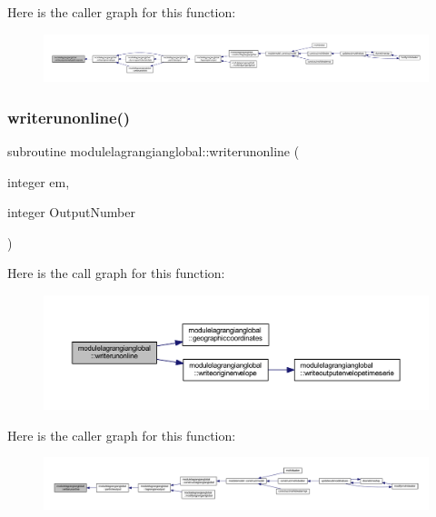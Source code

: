 Here is the caller graph for this function\+:\nopagebreak
\begin{figure}[H]
\begin{center}
\leavevmode
\includegraphics[width=350pt]{namespacemodulelagrangianglobal_a730caaa1e8cb909c0d86b6d7c081175c_icgraph}
\end{center}
\end{figure}
\mbox{\label{namespacemodulelagrangianglobal_af58c4faddb51056e6ab9190e049a564b}} 
\subsubsection{\texorpdfstring{writerunonline()}{writerunonline()}}
{\footnotesize\ttfamily subroutine modulelagrangianglobal\+::writerunonline (\begin{DoxyParamCaption}\item[{integer}]{em,  }\item[{integer}]{Output\+Number }\end{DoxyParamCaption})\hspace{0.3cm}{\ttfamily [private]}}

Here is the call graph for this function\+:\nopagebreak
\begin{figure}[H]
\begin{center}
\leavevmode
\includegraphics[width=350pt]{namespacemodulelagrangianglobal_af58c4faddb51056e6ab9190e049a564b_cgraph}
\end{center}
\end{figure}
Here is the caller graph for this function\+:\nopagebreak
\begin{figure}[H]
\begin{center}
\leavevmode
\includegraphics[width=350pt]{namespacemodulelagrangianglobal_af58c4faddb51056e6ab9190e049a564b_icgraph}
\end{center}
\end{figure}


